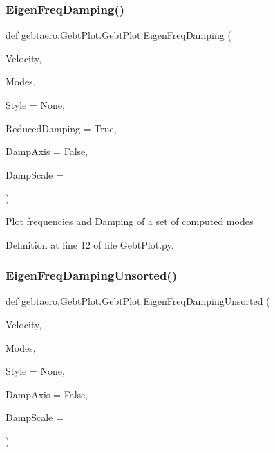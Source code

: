 \subsubsection{\texorpdfstring{Eigen\+Freq\+Damping()}{EigenFreqDamping()}}
{\footnotesize\ttfamily def gebtaero.\+Gebt\+Plot.\+Gebt\+Plot.\+Eigen\+Freq\+Damping (\begin{DoxyParamCaption}\item[{}]{Velocity,  }\item[{}]{Modes,  }\item[{}]{Style = {\ttfamily None},  }\item[{}]{Reduced\+Damping = {\ttfamily True},  }\item[{}]{Damp\+Axis = {\ttfamily False},  }\item[{}]{Damp\+Scale = {} }\end{DoxyParamCaption})}

\begin{DoxyVerb}Plot frequencies and Damping of a set of computed modes
\end{DoxyVerb}
 

Definition at line 12 of file Gebt\+Plot.\+py.

\mbox{\label{classgebtaero_1_1_gebt_plot_1_1_gebt_plot_a3c71db3cc350d3befddb115ade755867}} 
\subsubsection{\texorpdfstring{Eigen\+Freq\+Damping\+Unsorted()}{EigenFreqDampingUnsorted()}}
{\footnotesize\ttfamily def gebtaero.\+Gebt\+Plot.\+Gebt\+Plot.\+Eigen\+Freq\+Damping\+Unsorted (\begin{DoxyParamCaption}\item[{}]{Velocity,  }\item[{}]{Modes,  }\item[{}]{Style = {\ttfamily None},  }\item[{}]{Damp\+Axis = {\ttfamily False},  }\item[{}]{Damp\+Scale = {} }\end{DoxyParamCaption})}

